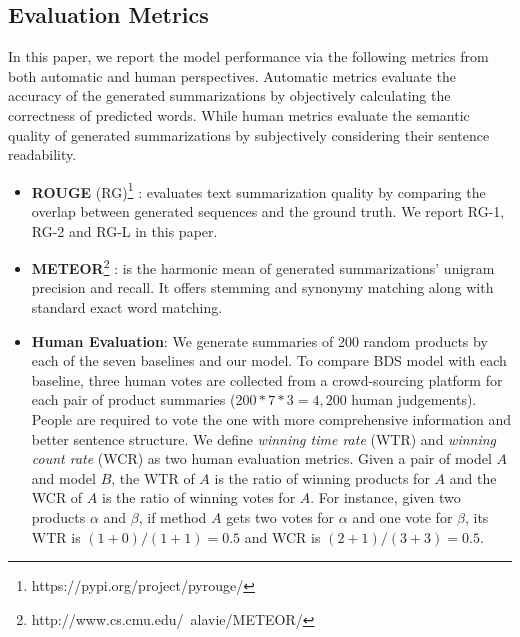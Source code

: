 \subsection{Evaluation Metrics}
In this paper, we report the model performance via the following metrics from both automatic and human perspectives. Automatic metrics evaluate the accuracy of the generated summarizations by objectively calculating the correctness of predicted words. While human metrics evaluate the semantic quality of generated summarizations by subjectively considering their sentence readability. 
\begin{itemize}
	\item \textbf{ROUGE} (RG)\footnote{https://pypi.org/project/pyrouge/}
	: evaluates text summarization quality by comparing the overlap between generated sequences and the ground truth. We report RG-1, RG-2 and RG-L in this paper.
	\item \textbf{METEOR}\footnote{http://www.cs.cmu.edu/~alavie/METEOR/}
	: is the harmonic mean of generated summarizations' unigram precision and recall. It offers stemming and synonymy matching along with standard exact word matching.
	
	\item \textbf{Human Evaluation}: We generate summaries of 200 random products by each of the seven baselines and our model. To compare BDS model with each baseline, three human votes are collected from a crowd-sourcing platform for each pair of product summaries ($200*7*3 = 4,200$ human judgements). People are required to vote the one with more comprehensive information and better sentence structure. We define \textit{winning time rate} (WTR) and \textit{winning count rate}  (WCR) as two human evaluation metrics. Given a pair of model $A$ and model $B$, the WTR of $A$ is the ratio of winning products for $A$ and the WCR of $A$ is the ratio of winning votes for $A$. For instance, given two products $\alpha$ and $\beta$, if method $A$ gets two votes for $\alpha$ and one vote for $\beta$, its WTR is $(1+0)/(1+1)=0.5$ and WCR is $(2+1)/(3+3)=0.5$.
\end{itemize}
